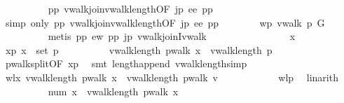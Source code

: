 \begin{isabellebody}
\ \ \ \ \ \ \ \ \isamarkupfalse%
\ pp\ vwalk{\isacharunderscore}join{\isacharunderscore}vwalk{\isacharunderscore}length{\isacharbrackleft}OF\ jp{\isacharbrackright}\ ee\ pp{\isacharprime}{\isacharparenleft}{}{\isacharparenright}\isanewline
\ \ \ \ \ \ \ \ \isamarkupfalse%
\ {\isacharparenleft}simp\ only{\isacharcolon}\ pp\ vwalk{\isacharunderscore}join{\isacharunderscore}vwalk{\isacharunderscore}length{\isacharbrackleft}OF\ jp{\isacharbrackright}\ ee\ pp{\isacharprime}{\isacharparenleft}{}{\isacharparenright}{\isacharparenright}\isanewline
\ \ \ \ \ \ \isamarkupfalse%
\ wp{\isacharcolon}\ {\isachardoublequoteopen}vwalk\ p\ G{\isachardoublequoteclose}\isanewline
\ \ \ \ \ \ \ \ \isamarkupfalse%
\ {\isacharparenleft}metis\ pp\ ew\ pp{\isacharprime}{\isacharparenleft}{}{\isacharparenright}\ jp\ vwalk{\isacharunderscore}joinI{\isacharunderscore}vwalk{\isacharparenright}\isanewline
\ \ \ \ \ \ \isacommand{{\isacharbraceleft}}\isamarkupfalse%
\isanewline
\ \ \ \ \ \ \ \ \isamarkupfalse%
\ x\ \isamarkupfalse%
\ xp{\isacharcolon}\ {\isachardoublequoteopen}x\ {\isasymin}\ set\ {\isacharquery}p{\isacharprime}{\isachardoublequoteclose}\isanewline
\ \ \ \ \ \ \ \ \isamarkupfalse%
\ {\isachardoublequoteopen}vwalk{\isacharunderscore}length\ {\isacharparenleft}pwalk\ x{\isacharparenright}\ {\isasymle}\ vwalk{\isacharunderscore}length\ {\isacharquery}p{\isacharprime}{\isachardoublequoteclose}\isanewline
\ \ \ \ \ \ \ \ \isamarkupfalse%
\ pwalk{\isacharunderscore}split{\isacharbrackleft}OF\ xp{\isacharbrackright}\ \isamarkupfalse%
\ {\isacharparenleft}smt\ length{\isacharunderscore}append\ vwalk{\isacharunderscore}length{\isacharunderscore}simp{\isacharparenright}\isanewline
\ \ \ \ \ \ \ \ \isamarkupfalse%
\ \isamarkupfalse%
\ wlx{\isacharcolon}\ {\isachardoublequoteopen}vwalk{\isacharunderscore}length\ {\isacharparenleft}pwalk\ x{\isacharparenright}\ {\isacharless}\ vwalk{\isacharunderscore}length\ {\isacharparenleft}pwalk\ v{\isacharparenright}{\isachardoublequoteclose}\isanewline
\ \ \ \ \ \ \ \ \ \ \isamarkupfalse%
\ wlp\ \isamarkupfalse%
\ linarith\isanewline
\ \ \ \ \ \ \ \ \isamarkupfalse%
\ {\isachardoublequoteopen}num\ x\ {\isacharequal}\ vwalk{\isacharunderscore}length\ {\isacharparenleft}pwalk\ x{\isacharparenright}{\isachardoublequoteclose}\isanewline
\ \ \ \ \ \ \ \ \ \ \isamarkupfalse%

\end{isabellebody}
